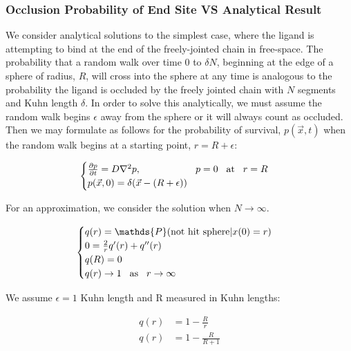 \documentclass[../../AdvancementSummary.tex]{subfiles}
\begin{document}
\subsubsection{Occlusion Probability of End Site VS Analytical Result}

We consider analytical solutions to the simplest case, where the ligand is attempting to bind at the end of the freely-jointed chain in free-space. The probability that a random walk over time 0 to $\delta N$, beginning at the edge of a sphere of radius, $R$, will cross into the sphere at any time is analogous to the probability the ligand is occluded by the freely jointed chain with $N$ segments and Kuhn length $\delta$. In order to solve this analytically, we must assume the random walk begins $\epsilon$ away from the sphere or it will always count as occluded. Then we may formulate as follows for the probability of survival, $p(\vec{x},t)$ when the random walk begins at a starting point, $r=R+\epsilon$:

\begin{equation}\label{eq: diffusion}
	\begin{cases}
		\frac{\partial p}{\partial t} = D \nabla^2 p, \hspace{2cm} p=0 \hspace{3mm}\text{at}\hspace{3mm} r=R\\
		p(\vec{x},0) = \delta(\vec{x}-(R+\epsilon))\\
	\end{cases}
\end{equation}

For an approximation, we consider the solution when $N\rightarrow \infty$.

 \begin{equation}\label{eq: analytic}
  	\begin{cases}
 	q(r)=\mathds{P}(\text{not hit sphere}|x(0)=r) \\
 	0=\frac{2}{r}q'(r)+q''(r) \\
 	q(R) = 0 \\
 	q(r) \rightarrow 1 \hspace{3mm}\text{as}\hspace{3mm} r \rightarrow \infty \\
 	\end{cases}
 \end{equation}

 We assume $\epsilon = 1$ Kuhn length and R measured in Kuhn lengths:

 \begin{align*}\label{eq: analyticSolution}
q(r) &= 1-\frac{R}{r}\\
q(r) &= 1-\frac{R}{R+1} \\
 \end{align*}
 
\end{document}
